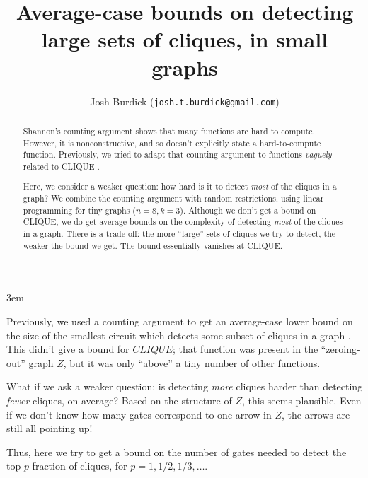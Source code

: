 \documentclass[12pt]{article}
\theoremstyle{definition}
\begin{document}
\emergencystretch 3em
\title{Average-case bounds on detecting large sets of cliques, in small graphs}

\author{Josh Burdick ({\tt josh.t.burdick@gmail.com})}

\maketitle

\begin{abstract}

Shannon's counting argument \cite{shannon_synthesis_1949} shows that many functions are hard to compute.
However, it is nonconstructive, and so doesn't explicitly state a
hard-to-compute function. Previously, we tried to adapt that
counting argument to functions {\em vaguely} related to CLIQUE \cite{buggyclique}.

Here, we consider a weaker question: how hard is it to detect {\em most}
of the cliques in a graph? We combine the counting argument with random
restrictions, using linear programming for tiny graphs ($n=8, k=3$). Although we don't get a bound
on CLIQUE, we do get average bounds on the complexity of detecting {\em most}
of the cliques in a graph. There is a trade-off: the more ``large''
sets of cliques we try to detect, the weaker the bound we get. The bound
essentially vanishes at CLIQUE.

\end{abstract}




Previously, we used a counting argument to get an average-case lower bound
on the size of the smallest circuit which detects some subset of cliques in a
graph \cite{buggyclique}.
This didn't give a bound for $CLIQUE$; that
function was present in the ``zeroing-out'' graph $Z$, but it was
only ``above'' a tiny number of other functions.

What if we ask a weaker question: is detecting {\em more} cliques
harder than detecting {\em fewer} cliques, on average? Based on
the structure of $Z$, this seems plausible. Even if we don't know
how many gates correspond to one arrow in $Z$, the arrows are still
all pointing up!

Thus, here we try to get a bound on the number of gates needed to
detect the top $p$ fraction of cliques, for $p=1, 1/2, 1/3, \dots$.
\end{document}
